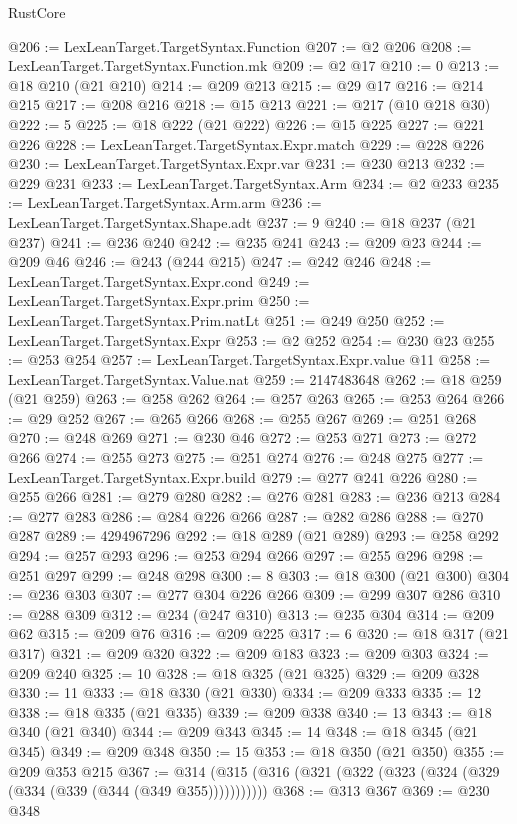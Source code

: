 \begin{lexlean}{RustCore}
\begin{coremodule}
@206 := LexLeanTarget.TargetSyntax.Function
@207 := @2 @206
@208 := LexLeanTarget.TargetSyntax.Function.mk
@209 := @2 @17
@210 := 0
@213 := @18 @210 (@21 @210)
@214 := @209 @213
@215 := @29 @17
@216 := @214 @215
@217 := @208 @216
@218 := @15 @213
@221 := @217 (@10 @218 @30)
@222 := 5
@225 := @18 @222 (@21 @222)
@226 := @15 @225
@227 := @221 @226
@228 := LexLeanTarget.TargetSyntax.Expr.match
@229 := @228 @226
@230 := LexLeanTarget.TargetSyntax.Expr.var
@231 := @230 @213
@232 := @229 @231
@233 := LexLeanTarget.TargetSyntax.Arm
@234 := @2 @233
@235 := LexLeanTarget.TargetSyntax.Arm.arm
@236 := LexLeanTarget.TargetSyntax.Shape.adt
@237 := 9
@240 := @18 @237 (@21 @237)
@241 := @236 @240
@242 := @235 @241
@243 := @209 @23
@244 := @209 @46
@246 := @243 (@244 @215)
@247 := @242 @246
@248 := LexLeanTarget.TargetSyntax.Expr.cond
@249 := LexLeanTarget.TargetSyntax.Expr.prim
@250 := LexLeanTarget.TargetSyntax.Prim.natLt
@251 := @249 @250
@252 := LexLeanTarget.TargetSyntax.Expr
@253 := @2 @252
@254 := @230 @23
@255 := @253 @254
@257 := LexLeanTarget.TargetSyntax.Expr.value @11
@258 := LexLeanTarget.TargetSyntax.Value.nat
@259 := 2147483648
@262 := @18 @259 (@21 @259)
@263 := @258 @262
@264 := @257 @263
@265 := @253 @264
@266 := @29 @252
@267 := @265 @266
@268 := @255 @267
@269 := @251 @268
@270 := @248 @269
@271 := @230 @46
@272 := @253 @271
@273 := @272 @266
@274 := @255 @273
@275 := @251 @274
@276 := @248 @275
@277 := LexLeanTarget.TargetSyntax.Expr.build
@279 := @277 @241 @226
@280 := @255 @266
@281 := @279 @280
@282 := @276 @281
@283 := @236 @213
@284 := @277 @283
@286 := @284 @226 @266
@287 := @282 @286
@288 := @270 @287
@289 := 4294967296
@292 := @18 @289 (@21 @289)
@293 := @258 @292
@294 := @257 @293
@296 := @253 @294 @266
@297 := @255 @296
@298 := @251 @297
@299 := @248 @298
@300 := 8
@303 := @18 @300 (@21 @300)
@304 := @236 @303
@307 := @277 @304 @226 @266
@309 := @299 @307 @286
@310 := @288 @309
@312 := @234 (@247 @310)
@313 := @235 @304
@314 := @209 @62
@315 := @209 @76
@316 := @209 @225
@317 := 6
@320 := @18 @317 (@21 @317)
@321 := @209 @320
@322 := @209 @183
@323 := @209 @303
@324 := @209 @240
@325 := 10
@328 := @18 @325 (@21 @325)
@329 := @209 @328
@330 := 11
@333 := @18 @330 (@21 @330)
@334 := @209 @333
@335 := 12
@338 := @18 @335 (@21 @335)
@339 := @209 @338
@340 := 13
@343 := @18 @340 (@21 @340)
@344 := @209 @343
@345 := 14
@348 := @18 @345 (@21 @345)
@349 := @209 @348
@350 := 15
@353 := @18 @350 (@21 @350)
@355 := @209 @353 @215
@367 := @314 (@315 (@316 (@321 (@322 (@323 (@324 (@329 (@334 (@339 (@344 (@349 @355)))))))))))
@368 := @313 @367
@369 := @230 @348

\end{coremodule}
\end{lexlean}
